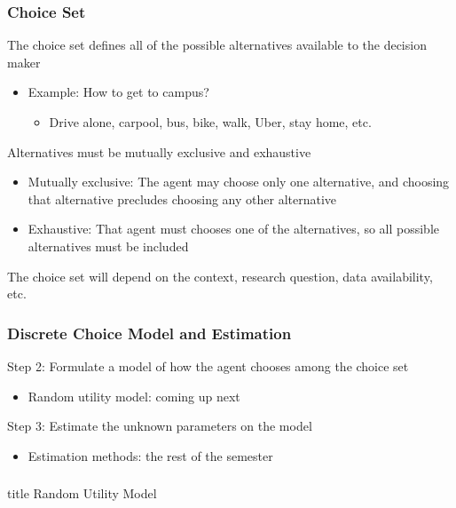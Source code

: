 \documentclass{beamer}\usepackage[]{graphicx}\usepackage[]{color}
\begin{document}
\begin{frame}\frametitle{Choice Set}
    The choice set defines all of the possible alternatives available to the decision maker
    \begin{itemize}
    	\item Example: How to get to campus?
    	\begin{itemize}
    		\item Drive alone, carpool, bus, bike, walk, Uber, stay home, etc.
    	\end{itemize}
    \end{itemize}
    \vspace{2ex}
    Alternatives must be mutually exclusive and exhaustive
    \begin{itemize}
    	\item Mutually exclusive: The agent may choose only one alternative, and choosing that alternative precludes choosing any other alternative
    	\item Exhaustive: That agent must chooses one of the alternatives, so all possible alternatives must be included
    \end{itemize}
    \vspace{2ex}
    The choice set will depend on the context, research question, data availability, etc.
\end{frame}

\begin{frame}\frametitle{Discrete Choice Model and Estimation}
    Step 2: Formulate a model of how the agent chooses among the choice set \\
    \begin{itemize}
    	\item Random utility model: coming up next
    \end{itemize}
    \vspace{3ex}
    Step 3: Estimate the unknown parameters on the model
    \begin{itemize}
    	\item Estimation methods: the rest of the semester
    \end{itemize}
\end{frame}

\begin{frame}\frametitle{}
    \vfill
    \centering
    \begin{beamercolorbox}[center]{title}
        \Large Random Utility Model
    \end{beamercolorbox}
    \vfill
\end{frame}
\end{document}
